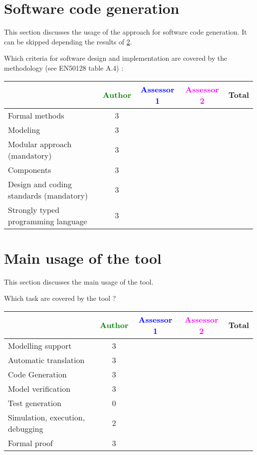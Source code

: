 \section{Software code generation}
This section discusses the usage of the approach for software code generation.
It can be skipped depending the results of \ref{main_usage}.

Which criteria for software design and implementation are covered by the methodology
(see EN50128 table A.4) :

\begin{tabular}{|l | c | c | c | c|}
\hline
& \textcolor{green}{Author} & \textcolor{blue}{Assessor 1} & \textcolor{magenta}{Assessor 2} & Total \\
\hline
Formal methods  & 3 & & &  \\
\hline 
Modeling  & 3 & & &  \\
\hline
Modular approach (mandatory) & 3 & & &  \\
\hline
Components & 3 & & &  \\
\hline
Design and coding standards (mandatory) & 3 & & &  \\
\hline
Strongly typed programming language & 3 & & &  \\
\hline

\end{tabular}



\section{Main usage of the tool}
\label{main_usage}

This section discusses the main usage of the tool.

Which task are covered by the tool ?


\begin{tabular}{|l | c | c | c | c|}
\hline
& \textcolor{green}{Author} & \textcolor{blue}{Assessor 1} & \textcolor{magenta}{Assessor 2} & Total \\
\hline 
Modelling support & 3 & & &  \\
\hline
Automatic translation  & 3 & & & \\
\hline
Code Generation  & 3 & & & \\
\hline
Model verification & 3 & & & \\
\hline
Test generation & 0 & & & \\
\hline
Simulation, execution, debugging & 2  & & & \\
\hline
Formal proof & 3 & & & \\
\hline
\end{tabular}

